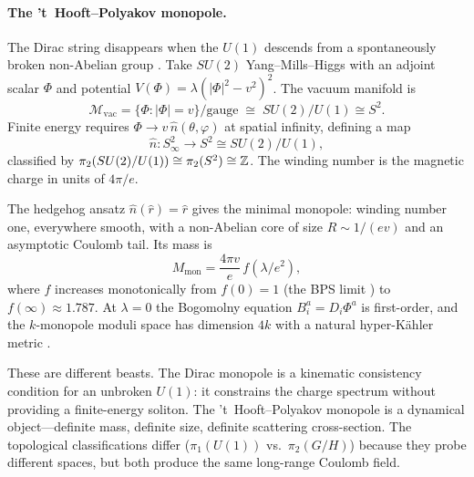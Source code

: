 \paragraph{The 't~Hooft--Polyakov monopole.}
The Dirac string disappears when the $U(1)$ descends from a spontaneously broken non-Abelian group \cite{tHooft1974MagneticMonopoles,Polyakov1974ParticleSpectrum}. Take $SU(2)$ Yang--Mills--Higgs with an adjoint scalar $\Phi$ and potential $V(\Phi) = \lambda(|\Phi|^2 - v^2)^2$. The vacuum manifold is
\begin{equation}
  \mathcal{M}_{\text{vac}} = \{\Phi : |\Phi| = v\}/\text{gauge} \;\cong\; SU(2)/U(1) \cong S^2.
  \label{eq:vacuum-manifold-su2}
\end{equation}
Finite energy requires $\Phi \to v\,\hat{n}(\theta,\varphi)$ at spatial infinity, defining a map
\begin{equation}
  \hat{n}: S^2_\infty \longrightarrow S^2 \cong SU(2)/U(1),
  \label{eq:hedgehog-map}
\end{equation}
classified by $\pi_2(SU(2)/U(1)) \cong \pi_2(S^2) \cong \mathbb{Z}$. The winding number is the magnetic charge in units of $4\pi/e$.

The hedgehog ansatz $\hat{n}(\hat{r}) = \hat{r}$ gives the minimal monopole: winding number one, everywhere smooth, with a non-Abelian core of size $R\sim 1/(ev)$ and an asymptotic Coulomb tail. Its mass is
\begin{equation}
  M_{\text{mon}} = \frac{4\pi v}{e}\,f(\lambda/e^2),
  \label{eq:thooft-polyakov-mass}
\end{equation}
where $f$ increases monotonically from $f(0) = 1$ (the BPS limit \cite{MantonSutcliffeTopologicalSolitons}) to $f(\infty) \approx 1.787$. At $\lambda= 0$ the Bogomolny equation $B_i^a = D_i\Phi^a$ is first-order, and the $k$-monopole moduli space has dimension $4k$ with a natural hyper-K\"ahler metric \cite{MantonSutcliffeTopologicalSolitons,ShnirMagneticMonopoles}.

\begin{remark}\label{rem:dirac-vs-thooft}
These are different beasts. The Dirac monopole is a kinematic consistency condition for an unbroken $U(1)$: it constrains the charge spectrum without providing a finite-energy soliton. The 't~Hooft--Polyakov monopole is a dynamical object---definite mass, definite size, definite scattering cross-section. The topological classifications differ ($\pi_1(U(1))$ vs.~$\pi_2(G/H)$) because they probe different spaces, but both produce the same long-range Coulomb field.
\end{remark}

